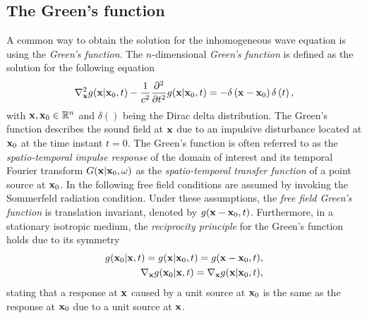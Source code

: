 \subsection{The Green's function}
A common way to obtain the solution for the inhomogeneous wave equation is using the \emph{Green's function}. 
The $n$-dimensional \emph{Green's function} is defined as the solution for the following equation \cite{Williams1999, Gumerov2004}
\begin{equation}
\nabla_{\mathbf{x}}^2 g(\mathbf{x}|\mathbf{x}_0,t) -\frac{1}{c^2}\frac{\partial^2}{\partial t^2} g(\mathbf{x}|\mathbf{x}_0,t) = -\delta\left( \mathbf{x} - \mathbf{x}_0 \right)\delta\left( t \right),\label{Eq:Theory:Green_function_def}
\end{equation}
with $\mathbf{x}, \mathbf{x}_0 \in \mathbb{R}^{n}$ and $\delta()$ being the Dirac delta distribution. 
The Green's function describes the sound field at $\mathbf{x}$ due to an impulsive disturbance located at $\mathbf{x}_0$ at the time instant $t = 0$.
The Green's function is often referred to as the \emph{spatio-temporal impulse response} of the domain of interest and its temporal Fourier transform $G(\mathbf{x}|\mathbf{x}_0,\omega)$ as the \emph{spatio-temporal transfer function} of a point source at $\mathbf{x}_0$. 
In the following free field conditions are assumed by invoking the Sommerfeld radiation condition. 
Under these assumptions, the \emph{free field Green's function} is translation invariant, denoted by $g(\mathbf{x}-\mathbf{x}_0,t)$.
Furthermore, in a stationary isotropic medium, the \emph{reciprocity principle} for the Green's function holds due to its symmetry \cite{Stakgold2011}
\begin{eqnarray}
\label{Eq:Theory:Green_fun_reciprocity}
g(\mathbf{x}_0|\mathbf{x},t) = g(\mathbf{x}|\mathbf{x}_0,t) = g(\mathbf{x}-\mathbf{x}_0,t), \\
\nabla_{\mathbf{x}} g(\mathbf{x}_0|\mathbf{x},t)= \nabla_{\mathbf{x}} g(\mathbf{x}|\mathbf{x}_0,t),
\end{eqnarray}
stating that a response at $\mathbf{x}$ caused by a unit source at $\mathbf{x}_0$ is the same as the response at $\mathbf{x}_0$ due to a unit source at $\mathbf{x}$.


